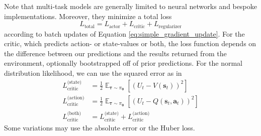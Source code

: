 \documentclass{article}
\begin{document}
Note that multi-task models are generally limited to neural networks and bespoke implementations. Moreover, they minimize a total loss \begin{equation}L_\text{total}=L_\text{actor}+L_\text{critic}+L_\text{regularizer}\end{equation} according to batch updates of Equation \ref{eq:simple_gradient_update}\cite{online_policy_gradient_review,openAI_part3}. For the critic, which predicts action- or state-values or both, the loss function depends on the difference between our predictions and the results returned from the environment, optionally bootstrapped off of prior predictions. For the normal distribution likelihood, we can use the squared error as in \begin{equation}\begin{split}L_\text{critic}^{\text{(state)}}&=\frac{1}{2}\mathop{\mathbb{E}}_{\boldsymbol{\tau}\sim\pi_{\boldsymbol{\theta}}}\left[\left(U_t-V(\mathbf{s}_{t})\right)^2\right]\\L_\text{critic}^{\text{(action)}}&=\frac{1}{2}\mathop{\mathbb{E}}_{\boldsymbol{\tau}\sim\pi_{\boldsymbol{\theta}}}\left[\left(U_t-Q(\mathbf{s}_{t},\mathbf{a}_t)\right)^2\right]\\L_\text{critic}^\text{(both)}&=L_\text{critic}^{\text{(state)}}+L_\text{critic}^{\text{(action)}}\end{split}\end{equation} Some variations may use the absolute error or the Huber loss. 
\end{document}
